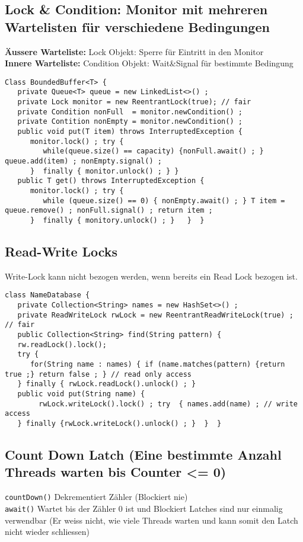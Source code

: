 \subsection{Lock \& Condition: Monitor mit mehreren Wartelisten für verschiedene Bedingungen}
\textbf{Äussere Warteliste:} Lock Objekt: Sperre für Eintritt in den Monitor \\
\textbf{Innere Warteliste:} Condition Objekt: Wait\&Signal für bestimmte Bedingung 

\begin{lstlisting}[style=java]
Class BoundedBuffer<T> {
   private Queue<T> queue = new LinkedList<>() ;
   private Lock monitor = new ReentrantLock(true); // fair
   private Condition nonFull  = monitor.newCondition() ;
   private Contition nonEmpty = monitor.newCondition() ;
   public void put(T item) throws InterruptedException { 
      monitor.lock() ; try {
         while(queue.size() == capacity) {nonFull.await() ; } queue.add(item) ; nonEmpty.signal() ;
      }  finally { monitor.unlock() ; } }
   public T get() throws InterruptedException {
      monitor.lock() ; try {
         while (queue.size() == 0) { nonEmpty.await() ; } T item = queue.remove() ; nonFull.signal() ; return item ;
      }  finally { monitory.unlock() ; }   }  }

\end{lstlisting}

\subsection{Read-Write Locks}
Write-Lock kann nicht bezogen werden, wenn bereits ein Read Lock bezogen ist.

\begin{lstlisting}[style=java]
class NameDatabase {
   private Collection<String> names = new HashSet<>() ;
   private ReadWriteLock rwLock = new ReentrantReadWriteLock(true) ; // fair
   public Collection<String> find(String pattern) { 
   rw.readLock().lock(); 
   try {
      for(String name : names) { if (name.matches(pattern) {return true ;} return false ; } // read only access
   } finally { rwLock.readLock().unlock() ; }
   public void put(String name) { 
   		rwLock.writeLock().lock() ; try  { names.add(name) ; // write access
   } finally {rwLock.writeLock().unlock() ; }  }  }	
\end{lstlisting}

\subsection{Count Down Latch (Eine bestimmte Anzahl Threads warten bis Counter <= 0)}
\lstinline|countDown()| Dekrementiert Zähler (Blockiert nie) \\
\lstinline|await()| Wartet bis der Zähler 0 ist und Blockiert 
Latches sind nur einmalig verwendbar (Er weiss nicht, wie viele Threads warten und kann somit den Latch nicht wieder schliessen)

